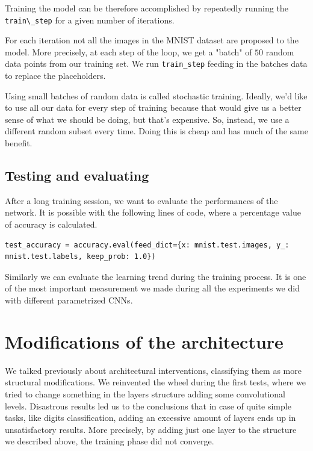 Training the model can be therefore accomplished by repeatedly running the \lstinline|train\_step| for a given number of iterations.

For each iteration not all the images in the \acs{MNIST} dataset are proposed to the model. More precisely, at each step of the loop, we get a "batch" of $50$ random data points from our training set. We run \lstinline|train_step| feeding in the batches data to replace the placeholders.

Using small batches of random data is called stochastic training. Ideally, we'd like to use all our data for every step of training because that would give us a better sense of what we should be doing, but that's expensive. So, instead, we use a different random subset every time. Doing this is cheap and has much of the same benefit.

\subsection{Testing and evaluating}

After a long training session, we want to evaluate the performances of the network. It is possible with the following lines of code, where a percentage value of accuracy is calculated.

\begin{lstlisting}
test_accuracy = accuracy.eval(feed_dict={x: mnist.test.images, y_: mnist.test.labels, keep_prob: 1.0})
\end{lstlisting}

Similarly we can evaluate the learning trend during the training process. It is one of the most important measurement we made during all the experiments we did with different parametrized \acsp{CNN}.

\section{Modifications of the architecture}

We talked previously about architectural interventions, classifying them as more structural modifications. We reinvented the wheel during the first tests, where we tried to change something in the layers structure adding some convolutional levels. Disastrous results led us to the conclusions that in case of quite simple tasks, like digits classification, adding an excessive amount of layers ends up in unsatisfactory results. More precisely, by adding just one layer to the structure we described above, the training phase did not converge. 

